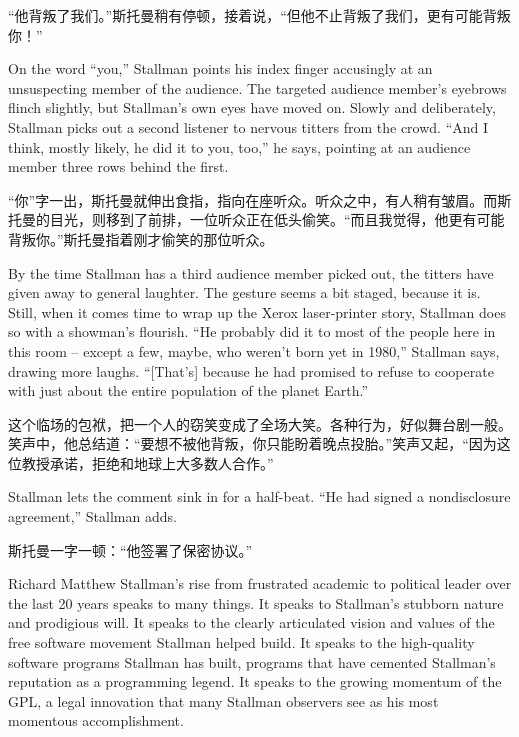 \ifdefined\chs
``他背叛了我们。''斯托曼稍有停顿，接着说，``但他不止背叛了我们，更有可能背叛你！''
\fi

\ifdefined\eng
On the word ``you,'' Stallman points his index finger accusingly at an unsuspecting member of the audience. The targeted audience member's eyebrows flinch slightly, but Stallman's own eyes have moved on. Slowly and deliberately, Stallman picks out a second listener to nervous titters from the crowd. ``And I think, mostly likely, he did it to you, too,'' he says, pointing at an audience member three rows behind the first.
\fi

\ifdefined\chs
``你''字一出，斯托曼就伸出食指，指向在座听众。听众之中，有人稍有皱眉。而斯托曼的目光，则移到了前排，一位听众正在低头偷笑。``而且我觉得，他更有可能背叛你。''斯托曼指着刚才偷笑的那位听众。
\fi

\ifdefined\eng
By the time Stallman has a third audience member picked out, the titters have given away to general laughter. The gesture seems a bit staged, because it is. Still, when it comes time to wrap up the Xerox laser-printer story, Stallman does so with a showman's flourish. ``He probably did it to most of the people here in this room -- except a few, maybe, who weren't born yet in 1980,'' Stallman says, drawing more laughs. ``[That's] because he had promised to refuse to cooperate with just about the entire population of the planet Earth.''
\fi

\ifdefined\chs
这个临场的包袱，把一个人的窃笑变成了全场大笑。各种行为，好似舞台剧一般。笑声中，他总结道：``要想不被他背叛，你只能盼着晚点投胎。''笑声又起，``因为这位教授承诺，拒绝和地球上大多数人合作。''
\fi

\ifdefined\eng
Stallman lets the comment sink in for a half-beat. ``He had signed a nondisclosure agreement,'' Stallman adds.
\fi

\ifdefined\chs
斯托曼一字一顿：``他签署了保密协议。''
\fi

\ifdefined\eng
Richard Matthew Stallman's rise from frustrated academic to political leader over the last 20 years speaks to many things. It speaks to Stallman's stubborn nature and prodigious will. It speaks to the clearly articulated vision and values of the free software movement Stallman helped build. It speaks to the high-quality software programs Stallman has built, programs that have cemented Stallman's reputation as a programming legend. It speaks to the growing momentum of the GPL, a legal innovation that many Stallman observers see as his most momentous accomplishment.
\fi

